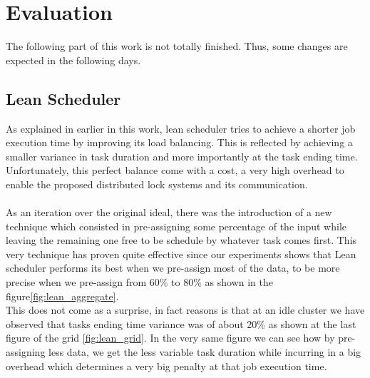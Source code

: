 \section{Evaluation}
The following part of this work is not totally finished. Thus, some changes are expected in the following days.
\subsection{Lean Scheduler}
As explained in earlier in this work, lean scheduler tries to achieve a shorter job execution time by improving its load balancing. This is reflected by achieving a smaller variance in task duration and more importantly at the task ending time. Unfortunately, this perfect balance come with a cost, a very high overhead to enable the proposed distributed lock systems and its communication. \\ \\
As an iteration over the original ideal, there was the introduction of a new technique which consisted in pre-assigning some percentage of the input while leaving the remaining one free to be schedule by whatever task comes first. This very technique has proven quite effective since our experiments shows that Lean scheduler performs its best when we pre-assign most of the data, to be more precise when we pre-assign from  $60\%$ to $80\%$ as shown in the figure\ref{fig:lean_aggregate}.  \\

This does not come as a surprise, in fact reasons is that at an idle cluster we have observed that tasks ending time variance was of about 20\% as shown at the last figure of the grid \ref{fig:lean_grid}. In the very same figure we can see how by pre-assigning less data, we get the less variable task duration while incurring in a big overhead which determines a very big penalty at that job execution time.

